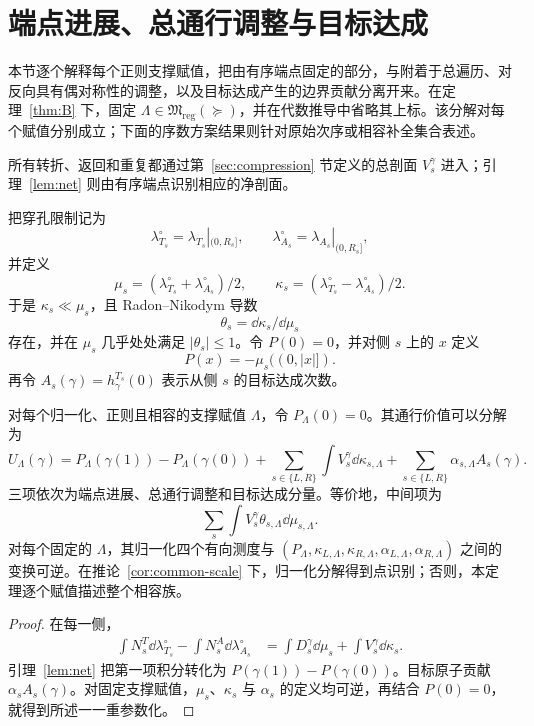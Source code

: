 \section{端点进展、总通行调整与目标达成}\label{sec:pha}

本节逐个解释每个正则支撑赋值，把由有序端点固定的部分，与附着于总遍历、对反向具有偶对称性的调整，以及目标达成产生的边界贡献分离开来。在定理~\ref{thm:B} 下，固定 $\Lambda\in\mathfrak M_{\mathrm{reg}}(\succeq)$，并在代数推导中省略其上标。该分解对每个赋值分别成立；下面的序数方案结果则针对原始次序或相容补全集合表述。

所有转折、返回和重复都通过第~\ref{sec:compression} 节定义的总剖面 $V_s^\gamma$ 进入；引理~\ref{lem:net} 则由有序端点识别相应的净剖面。

把穿孔限制记为
\[
 \lambda_{T_s}^{\circ}=\lambda_{T_s}|_{(0,R_s]},
 \qquad
 \lambda_{A_s}^{\circ}=\lambda_{A_s}|_{(0,R_s]},
\]
并定义
\[
 \mu_s=(\lambda_{T_s}^{\circ}+\lambda_{A_s}^{\circ})/2,
 \qquad
 \kappa_s=(\lambda_{T_s}^{\circ}-\lambda_{A_s}^{\circ})/2.
\]
于是 $\kappa_s\ll\mu_s$，且 Radon--Nikodym 导数
\[
 \theta_s=\dd\kappa_s/\dd\mu_s
\]
存在，并在 $\mu_s$ 几乎处处满足 $|\theta_s|\le1$。令 $P(0)=0$，并对侧 $s$ 上的 $x$ 定义
\[
 P(x)=-\mu_s((0,|x|]).
\]
再令 $A_s(\gamma)=h^{T_s}_\gamma(0)$ 表示从侧 $s$ 的目标达成次数。

\begin{theorem}\label{thm:C}
对每个归一化、正则且相容的支撑赋值 $\Lambda$，令 $P_\Lambda(0)=0$。其通行价值可以分解为
\[
\boxed{
 U_\Lambda(\gamma)
 =P_\Lambda(\gamma(1))-P_\Lambda(\gamma(0))
 +\sum_{s\in\{L,R\}}\int V_s^\gamma\dd\kappa_{s,\Lambda}
 +\sum_{s\in\{L,R\}}\alpha_{s,\Lambda} A_s(\gamma).}
\]
三项依次为端点进展、总通行调整和目标达成分量。等价地，中间项为
\[
 \sum_s\int V_s^\gamma\theta_{s,\Lambda}\dd\mu_{s,\Lambda}.
\]
对每个固定的 $\Lambda$，其归一化四个有向测度与 $(P_\Lambda,\kappa_{L,\Lambda},\kappa_{R,\Lambda},\alpha_{L,\Lambda},\alpha_{R,\Lambda})$ 之间的变换可逆。在推论~\ref{cor:common-scale} 下，归一化分解得到点识别；否则，本定理逐个赋值描述整个相容族。
\end{theorem}

\begin{proof}
在每一侧，
\[
\begin{aligned}
 \int N_s^T\dd\lambda_{T_s}^{\circ}
 -\int N_s^A\dd\lambda_{A_s}^{\circ}
 &=\int D_s^\gamma\dd\mu_s+\int V_s^\gamma\dd\kappa_s.
\end{aligned}
\]
引理~\ref{lem:net} 把第一项积分转化为 $P(\gamma(1))-P(\gamma(0))$。目标原子贡献 $\alpha_s A_s(\gamma)$。对固定支撑赋值，$\mu_s$、$\kappa_s$ 与 $\alpha_s$ 的定义均可逆，再结合 $P(0)=0$，就得到所述一一重参数化。
\end{proof}

